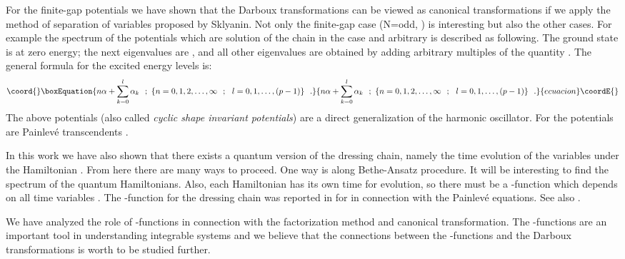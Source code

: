 \documentclass[a4paper,11pt]{article}
\begin{document}
For the finite-gap potentials we have shown that the Darboux transformations
can be viewed as canonical transformations if we apply the method of
separation of variables proposed by Sklyanin. Not only the finite-gap case
(N=odd, \coordHE{} ) is interesting but also the other cases. For example
the spectrum of the potentials which are solution of the chain in the case
 \coordHE{} and arbitrary \coordHE{} is described as following.
The ground state is at zero energy; the next \coordHE{} eigenvalues
are \coordHE{}, and all other
eigenvalues are obtained by adding arbitrary multiples
of the quantity \coordHE{}. The general formula for the excited energy levels is: \cite{Sukhatme}
\begin{equation}\coord{}\boxEquation{
n \alpha + \sum_{k=0}^l \alpha_k ~~;
~\{n=0,1,2,\ldots,\infty~~;~~l=0,1,\ldots,(p-1)\}~~.
\label{ev}
}{
n \alpha + \sum_{k=0}^l \alpha_k ~~;
~\{n=0,1,2,\ldots,\infty~~;~~l=0,1,\ldots,(p-1)\}~~.
}{ecuacion}\coordE{}\end{equation}
The above potentials (also called {\em cyclic shape invariant potentials})
are a direct generalization of the harmonic oscillator.
For \coordHE{} the potentials are Painlev\'e transcendents \cite{Veselov}.

In this work we have also shown that there exists a quantum version of the dressing
chain, namely the time evolution of the variables \coordHE{} under the Hamiltonian
\coordHE{}. From here there are many ways to proceed. One way is along Bethe-Ansatz
procedure. It will be interesting to find the spectrum of the quantum Hamiltonians.
Also, each Hamiltonian \coordHE{} has its own time \coordHE{} for evolution, so there must be
a \myHighlight{$\tau $}\coordHE{}-function which depends on all time variables \coordHE{}. The
\myHighlight{$\tau $}\coordHE{}-function for the dressing chain was reported in \cite{Okamoto} for \coordHE{}
in connection with the Painlev\'{e} equations. See also \cite{Yamada}.

We have analyzed the role of \myHighlight{$\tau$}\coordHE{} -functions in connection with the factorization
method and canonical transformation. The \myHighlight{$\tau$}\coordHE{} -functions are an important tool in
understanding integrable systems and we believe that the connections between the
\myHighlight{$\tau$}\coordHE{} -functions and the Darboux transformations is worth to be studied further.
\end{document}
